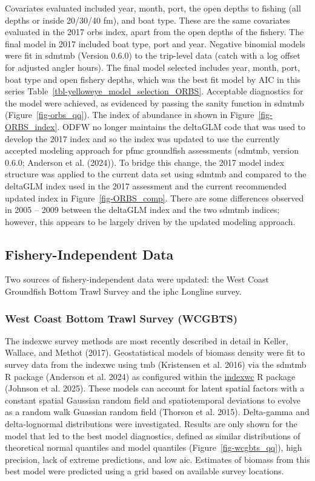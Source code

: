 \documentclass[
]{scrartcl}
\begin{document}
Covariates evaluated included year, month, port, the open depths to
fishing (all depths or inside 20/30/40 fm), and boat type. These are the
same covariates evaluated in the 2017 \gls{orbs} index, apart from the
open depths of the fishery. The final model in 2017 included boat type,
port and year. Negative binomial models were fit in \gls{sdmtmb}
(Version 0.6.0) to the trip-level data (catch with a log offset for
adjusted angler hours). The final model selected includes year, month,
port, boat type and open fishery depths, which was the best fit model by
AIC in this series Table~\ref{tbl-yelloweye_model_selection_ORBS}.
Acceptable diagnostics for the model were achieved, as evidenced by
passing the sanity function in \gls{sdmtmb} (Figure~\ref{fig-orbs_qq}).
The index of abundance in shown in Figure~\ref{fig-ORBS_index}. ODFW no
longer maintains the deltaGLM code that was used to develop the 2017
index and so the index was updated to use the currently accepted
modeling approach for \gls{pfmc} groundfish assessments (\gls{sdmtmb},
version 0.6.0; Anderson et al. (2024)). To bridge this change, the 2017
model index structure was applied to the current data set using
\gls{sdmtmb} and compared to the deltaGLM index used in the 2017
assessment and the current recommended updated index in
Figure~\ref{fig-ORBS_comp}. There are some differences observed in 2005
-- 2009 between the deltaGLM index and the two \gls{sdmtmb} indices;
however, this appears to be largely driven by the updated modeling
approach.

\subsection{Fishery-Independent Data}\label{fishery-independent-data}

Two sources of fishery-independent data were updated: the West Coast
Groundfish Bottom Trawl Survey and the \gls{iphc} Longline survey.

\subsubsection{West Coast Bottom Trawl Survey
(WCGBTS)}\label{west-coast-bottom-trawl-survey-wcgbts}

The \gls{indexwc} survey methods are most recently described in detail
in Keller, Wallace, and Methot (2017). Geostatistical models of biomass
density were fit to survey data from the \gls{indexwc} using \gls{tmb}
(Kristensen et al. 2016) via the \gls{sdmtmb} R package (Anderson et al.
2024) as configured within the
\href{https://github.com/pfmc-assessments/indexwc}{indexwc} R package
(Johnson et al. 2025). These models can account for latent spatial
factors with a constant spatial Gaussian random field and spatiotemporal
deviations to evolve as a random walk Guassian random field (Thorson et
al. 2015). Delta-gamma and delta-lognormal distributions were
investigated. Results are only shown for the model that led to the best
model diagnostics, defined as similar distributions of theoretical
normal quantiles and model quantiles (Figure~\ref{fig-wcgbts_qq}), high
precision, lack of extreme predictions, and low \gls{aic}. Estimates of
biomass from this best model were predicted using a grid based on
available survey locations.
\end{document}
